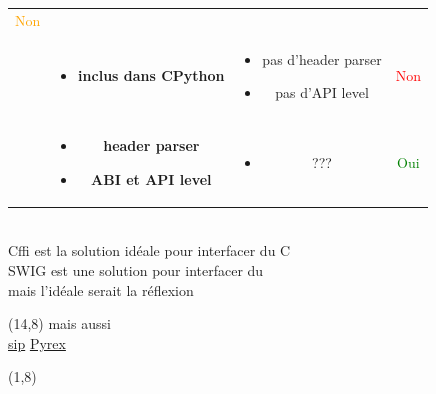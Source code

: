 \begin{frame}
\begin{center}
\begin{tabular}{lccc}
      \textcolor{orange}{Non} \\[1em] %
      {\href{https://docs.python.org/3.4/library/ctypes.html}{Ctypes}} &
      \begin{minipage}[t]{.2\linewidth}
        \tiny
        \begin{itemize}
        \item \textbf{inclus dans CPython}
        \end{itemize}
      \end{minipage} &
      \begin{minipage}[t]{.45\linewidth}
        \tiny
        \begin{itemize}
          \item pas d'header parser
          \item pas d'API level
        \end{itemize}
      \end{minipage} &
      \textcolor{red}{Non} \\[1em]
      {\href{https://cffi.readthedocs.org/en/release-0.8}{Cffi}} &
      \begin{minipage}[t]{.2\linewidth}
        \tiny
        \begin{itemize}
        \item \textbf{header parser}
        \item \textbf{ABI et API level}
        \end{itemize}
      \end{minipage} &
      \begin{minipage}[t]{.45\linewidth}
        \tiny
        \begin{itemize}
        \item ???
        \end{itemize}
      \end{minipage} &
    \textcolor{green}{Oui}
    \end{tabular} \\[2em]
    \alert{Cffi est la solution idéale pour interfacer du C} \\[.5em]
    \alert{SWIG est une solution pour interfacer du \Cpp} \\[.5em]
    \alert{mais l'idéale serait la réflexion}
  \end{center}
  \begin{textblock}{5}(14,8)
    \tiny mais aussi\\
    \href{http://www.riverbankcomputing.com/software/sip/intro}{sip}
    \href{http://www.cosc.canterbury.ac.nz/greg.ewing/python/Pyrex/}{Pyrex}
  \end{textblock}
  \begin{textblock}{5}(1,8)
  \end{textblock}
\end{frame}

